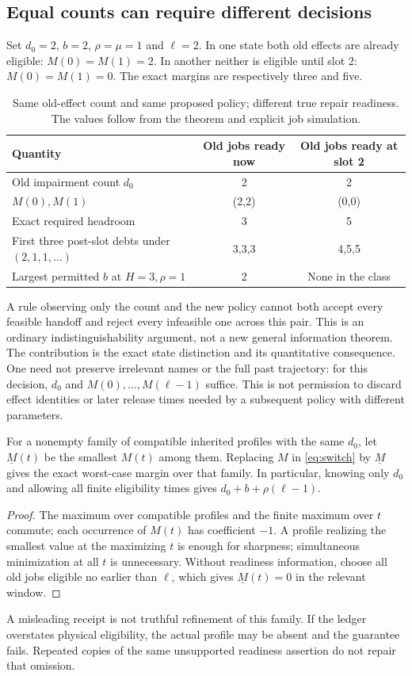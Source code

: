 \subsection{Equal counts can require different decisions}
Set $d_0=2$, $b=2$, $\rho=\mu=1$ and $\ell=2$. In one state both old effects are already eligible: $M(0)=M(1)=2$. In another neither is eligible until slot 2: $M(0)=M(1)=0$. The exact margins are respectively three and five.
\begin{table}[ht]
\centering\small
\caption{Same old-effect count and same proposed policy; different true repair readiness. The values follow from the theorem and explicit job simulation.}
\label{tab:ages}
\begin{tabular}{@{}lcc@{}}\toprule
Quantity & Old jobs ready now & Old jobs ready at slot 2\\\midrule
Old impairment count $d_0$ &2&2\\
$M(0),M(1)$ &(2,2)&(0,0)\\
Exact required headroom &3&5\\
First three post-slot debts under $(2,1,1,\ldots)$ &3,3,3&4,5,5\\
Largest permitted $b$ at $H=3,\rho=1$ &2&None in the class\\\bottomrule
\end{tabular}
\end{table}
A rule observing only the count and the new policy cannot both accept every feasible handoff and reject every infeasible one across this pair. This is an ordinary indistinguishability argument, not a new general information theorem. The contribution is the exact state distinction and its quantitative consequence. One need not preserve irrelevant names or the full past trajectory: for this decision, $d_0$ and $M(0),\ldots,M(\ell-1)$ suffice. This is not permission to discard effect identities or later release times needed by a subsequent policy with different parameters.

\begin{corollary}
For a nonempty family of compatible inherited profiles with the same $d_0$, let $\underline M(t)$ be the smallest $M(t)$ among them. Replacing $M$ in \cref{eq:switch} by $\underline M$ gives the exact worst-case margin over that family. In particular, knowing only $d_0$ and allowing all finite eligibility times gives $d_0+b+\rho(\ell-1)$.
\end{corollary}
\begin{proof}
The maximum over compatible profiles and the finite maximum over $t$ commute; each occurrence of $M(t)$ has coefficient $-1$. A profile realizing the smallest value at the maximizing $t$ is enough for sharpness; simultaneous minimization at all $t$ is unnecessary. Without readiness information, choose all old jobs eligible no earlier than $\ell$, which gives $\underline M(t)=0$ in the relevant window.
\end{proof}
A misleading receipt is not truthful refinement of this family. If the ledger overstates physical eligibility, the actual profile may be absent and the guarantee fails. Repeated copies of the same unsupported readiness assertion do not repair that omission.

